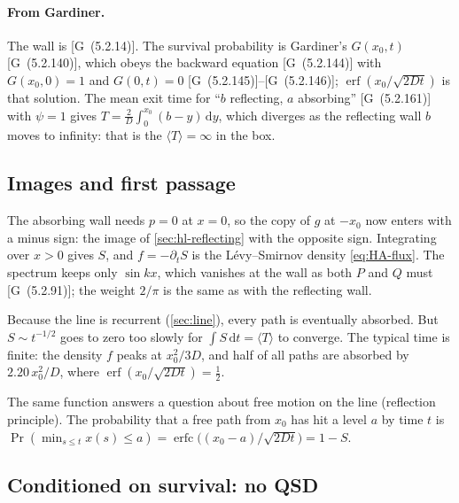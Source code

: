 \documentclass[11pt]{article}
\numberwithin{equation}{section}
\newcommand{\dd}{\mathrm{d}}
\newcommand{\avg}[1]{\langle #1\rangle}
\newcommand{\G}[1]{[G~(#1)]}
\begin{document}
\paragraph{From Gardiner.} The wall is \G{5.2.14}. The survival probability is Gardiner's $G(x_0,t)$
\G{5.2.140}, which obeys the backward equation \G{5.2.144} with $G(x_0,0)=1$ and $G(0,t)=0$
\G{5.2.145}--\G{5.2.146}; $\operatorname{erf}(x_0/\sqrt{2Dt})$ is that solution. The mean exit time for
``$b$ reflecting, $a$ absorbing'' \G{5.2.161} with $\psi=1$ gives $T=\frac2D\int_0^{x_0}(b-y)\,\dd y$, which
diverges as the reflecting wall $b$ moves to infinity: that is the $\avg T=\infty$ in the box.

\subsection{Images and first passage}

The absorbing wall needs $p=0$ at $x=0$, so the copy of $g$ at $-x_0$ now enters with a minus sign: the image
of \cref{sec:hl-reflecting} with the opposite sign. Integrating over $x>0$ gives $S$, and $f=-\partial_tS$ is
the L\'evy--Smirnov density \cref{eq:HA-flux}. The spectrum keeps only $\sin kx$, which vanishes at the wall as
both $P$ and $Q$ must \G{5.2.91}; the weight $2/\pi$ is the same as with the reflecting wall.

Because the line is recurrent (\cref{sec:line}), every path is eventually absorbed. But $S\sim t^{-1/2}$ goes
to zero too slowly for $\int S\,\dd t=\avg{T}$ to converge. The typical time is finite: the density $f$ peaks at $x_0^2/3D$, and half of all paths are absorbed by
$2.20\,x_0^2/D$, where $\operatorname{erf}(x_0/\sqrt{2Dt})=\tfrac12$.

The same function answers a question about free motion on the line (reflection principle). The probability
that a free path from $x_0$ has hit a level $a$ by time $t$ is
$\Pr(\min_{s\le t}x(s)\le a)=\operatorname{erfc}\bigl((x_0-a)/\sqrt{2Dt}\bigr)=1-S$.

\subsection{Conditioned on survival: no QSD}
\end{document}
